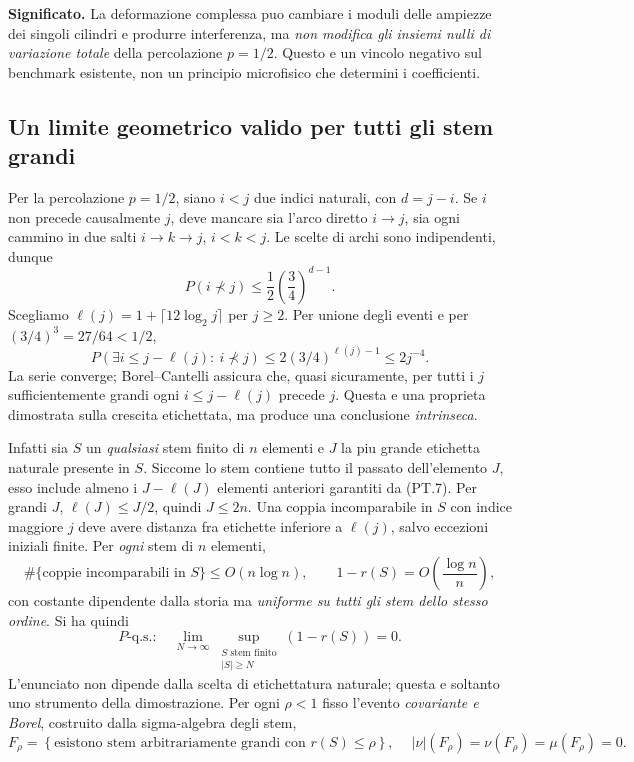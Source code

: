 \documentclass[11pt,a4paper]{article}
\begin{document}
\textbf{Significato.} La deformazione complessa puo cambiare i moduli delle ampiezze dei singoli cilindri e produrre interferenza, ma \emph{non modifica gli insiemi nulli di variazione totale} della percolazione $p=1/2$. Questo e un vincolo negativo sul benchmark esistente, non un principio microfisico che determini i coefficienti.

\clearpage
\subsection*{Un limite geometrico valido per tutti gli stem grandi}
Per la percolazione $p=1/2$, siano $i<j$ due indici naturali, con $d=j-i$. Se $i$ non precede causalmente $j$, deve mancare sia l'arco diretto $i\to j$, sia ogni cammino in due salti $i\to k\to j$, $i<k<j$. Le scelte di archi sono indipendenti, dunque
\begin{equation}
P(i\not\prec j)\le\frac12\left(\frac34\right)^{d-1}.
\tag{PT.6}
\end{equation}
Scegliamo $\ell(j)=1+\lceil12\log_2j\rceil$ per $j\ge2$. Per unione degli eventi e per $(3/4)^3=27/64<1/2$,
\begin{equation}
P\left(\exists i\le j-\ell(j):\ i\not\prec j\right)
\le2(3/4)^{\ell(j)-1}\le 2j^{-4}.
\tag{PT.7}
\end{equation}
La serie converge; Borel--Cantelli assicura che, quasi sicuramente, per tutti i $j$ sufficientemente grandi ogni $i\le j-\ell(j)$ precede $j$. Questa e una proprieta dimostrata sulla crescita etichettata, ma produce una conclusione \emph{intrinseca}.

Infatti sia $S$ un \emph{qualsiasi} stem finito di $n$ elementi e $J$ la piu grande etichetta naturale presente in $S$. Siccome lo stem contiene tutto il passato dell'elemento $J$, esso include almeno i $J-\ell(J)$ elementi anteriori garantiti da (PT.7). Per grandi $J$, $\ell(J)\le J/2$, quindi $J\le2n$. Una coppia incomparabile in $S$ con indice maggiore $j$ deve avere distanza fra etichette inferiore a $\ell(j)$, salvo eccezioni iniziali finite. Per \emph{ogni} stem di $n$ elementi,
\begin{equation}
\#\{\text{coppie incomparabili in }S\}\le O(n\log n),
\qquad 1-r(S)=O\!\left(\frac{\log n}{n}\right),
\tag{PT.8}
\end{equation}
con costante dipendente dalla storia ma \emph{uniforme su tutti gli stem dello stesso ordine}. Si ha quindi
\begin{equation}
\boxed{\ P\text{-q.s.}:\quad\lim_{N\to\infty}
\sup_{\substack{S\text{ stem finito}\\ |S|\ge N}}(1-r(S))=0.\ }
\tag{PT.9}
\end{equation}
L'enunciato non dipende dalla scelta di etichettatura naturale; questa e soltanto uno strumento della dimostrazione. Per ogni $\rho<1$ fisso l'evento \emph{covariante e Borel}, costruito dalla sigma-algebra degli stem,
\begin{equation}
F_\rho=\left\{\text{esistono stem arbitrariamente grandi con }r(S)\le\rho\right\},
\quad\boxed{\ |\nu|(F_\rho)=\nu(F_\rho)=\mu(F_\rho)=0.\ }
\tag{PT.10}
\end{equation}
\clearpage
\end{document}
